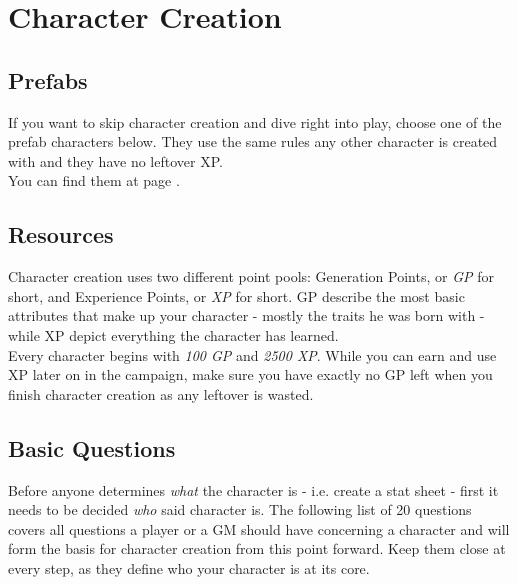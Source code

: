 \documentclass[12pt,a4paper,openany,usenames,dvipsnames]{book}
\begin{document}
	\chapter{Character Creation}
	\section{Prefabs}
	If you want to skip character creation and dive right into play, choose one of the prefab characters below.
	They use the same rules any other character is created with and they have no leftover XP.
	\\
	You can find them at page \pageref{sec:pfchars}.
	
	\section{Resources}
	\label{sec:ccResources}
	Character creation uses two different point pools: Generation Points, or \emph{GP} for short, and Experience Points, or \emph{XP} for short. 
	GP describe the most basic attributes that make up your character - mostly the traits he was born with - while XP depict everything the character has learned.\\
	Every character begins with \emph{100 GP} and \emph{2500 XP}. While you can earn and use XP later on in the campaign, make sure you have exactly no GP left when you finish character creation as any leftover is wasted.
	
	\section{Basic Questions}
	Before anyone determines \emph{what} the character is - i.e. create a stat sheet - first it needs to be decided \emph{who} said character is. The following list of 20 questions covers all questions a player or a GM should have concerning a character and will form the basis for character creation from this point forward. Keep them close at every step, as they define who your character is at its core.

	\pagebreak
\end{document}

